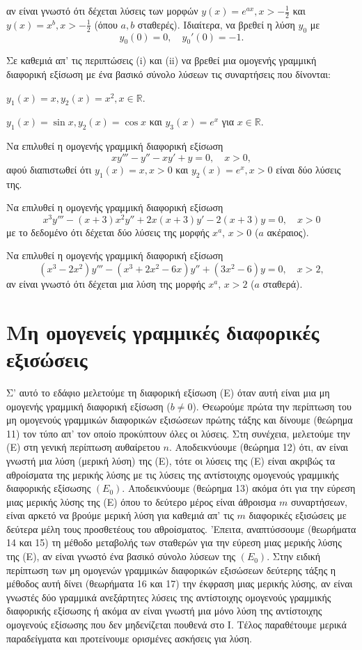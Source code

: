 \documentclass[11pt,a4paper,twoside]{book}
\begin{document}
\begin{askhseis}
\[\]
αν είναι γνωστό ότι δέχεται λύσεις των μορφών $y(x)=e^{ax}, x>-\frac{1}{2}$ και $y(x)=x^b, x>-\frac{1}{2}$ (όπου $a, b$ σταθερές). Ιδιαίτερα, να βρεθεί η λύση $y_0$ με
\[
    y_0(0)=0, \quad y_0'(0)=-1.
\]
\item Σε καθεμιά απ' τις περιπτώσεις (i) και (ii) να βρεθεί μια ομογενής γραμμική διαφορική εξίσωση με ένα βασικό σύνολο λύσεων τις συναρτήσεις που δίνονται:
    \begin{rlist}
        \item $y_1(x)=x, y_2(x)=x^2, x\in\mathbb{R}$.
        \item $y_1(x)=\sin x, y_2(x)=\cos x$ και $y_3(x)=e^x$ για $x\in\mathbb{R}$.
    \end{rlist}
\item Να επιλυθεί η ομογενής γραμμική διαφορική εξίσωση
\[
    x y''' - y'' - xy' + y = 0, \quad x>0,
\]
αφού διαπιστωθεί ότι $y_1(x)=x, x>0$ και $y_2(x)=e^x, x>0$ είναι δύο λύσεις της.
\item Να επιλυθεί η ομογενής γραμμική διαφορική εξίσωση
\[
    x^3 y''' - (x+3)x^2 y'' + 2x(x+3)y' - 2(x+3)y=0, \quad x>0
\]
με το δεδομένο ότι δέχεται δύο λύσεις της μορφής $x^a$, $x>0$ ($a$ ακέραιος).
\item Να επιλυθεί η ομογενής γραμμική διαφορική εξίσωση
\[
    (x^3-2x^2)y''' - (x^3+2x^2-6x)y'' + (3x^2-6)y=0, \quad x>2,
\]
αν είναι γνωστό ότι δέχεται μια λύση της μορφής $x^a$, $x>2$ ($a$ σταθερά).
\end{askhseis}


\section{Μη ομογενείς γραμμικές διαφορικές εξισώσεις}
Σ' αυτό το εδάφιο μελετούμε τη διαφορική εξίσωση (Ε) όταν αυτή είναι μια μη ομογενής γραμμική διαφορική εξίσωση ($b \ne 0$). Θεωρούμε πρώτα την περίπτωση του μη ομογενούς γραμμικών διαφορικών εξισώσεων πρώτης τάξης και δίνουμε (θεώρημα 11) τον τύπο απ' τον οποίο προκύπτουν όλες οι λύσεις. Στη συνέχεια, μελετούμε την (Ε) στη γενική περίπτωση αυθαίρετου $n$. Αποδεικνύουμε (θεώρημα 12) ότι, αν είναι γνωστή μια λύση (μερική λύση) της (Ε), τότε οι λύσεις της (Ε) είναι ακριβώς τα αθροίσματα της μερικής λύσης με τις λύσεις της αντίστοιχης ομογενούς γραμμικής διαφορικής εξίσωσης $(E_0)$. Αποδεικνύουμε (θεώρημα 13) ακόμα ότι για την εύρεση μιας μερικής λύσης της (Ε) όπου το δεύτερο μέρος είναι άθροισμα $m$ συναρτήσεων, είναι αρκετό να βρούμε μερική λύση για καθεμιά απ' τις $m$ διαφορικές εξισώσεις με δεύτερα μέλη τους προσθετέους του αθροίσματος. 'Επειτα, αναπτύσσουμε (θεωρήματα 14 και 15) τη μέθοδο μεταβολής των σταθερών για την εύρεση μιας μερικής λύσης της (Ε), αν είναι γνωστό ένα βασικό σύνολο λύσεων της $(E_0)$. Στην ειδική περίπτωση των μη ομογενών γραμμικών διαφορικών εξισώσεων δεύτερης τάξης η μέθοδος αυτή δίνει (θεωρήματα 16 και 17) την έκφραση μιας μερικής λύσης, αν είναι γνωστές δύο γραμμικά ανεξάρτητες λύσεις της αντίστοιχης ομογενούς γραμμικής διαφορικής εξίσωσης ή ακόμα αν είναι γνωστή μια μόνο λύση της αντίστοιχης ομογενούς εξίσωσης που δεν μηδενίζεται πουθενά στο Ι. Τέλος παραθέτουμε μερικά παραδείγματα και προτείνουμε ορισμένες ασκήσεις για λύση.
\end{document}
